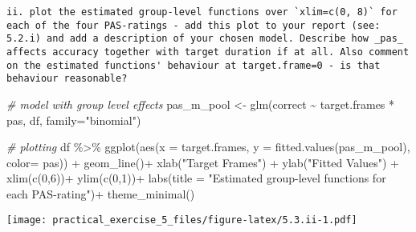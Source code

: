 \documentclass[
]{article}
\newenvironment{Shaded}{\begin{snugshade}}{\end{snugshade}}
\newcommand{\AttributeTok}[1]{\textcolor[rgb]{0.77,0.63,0.00}{#1}}
\newcommand{\CommentTok}[1]{\textcolor[rgb]{0.56,0.35,0.01}{\textit{#1}}}
\newcommand{\DecValTok}[1]{\textcolor[rgb]{0.00,0.00,0.81}{#1}}
\newcommand{\FunctionTok}[1]{\textcolor[rgb]{0.00,0.00,0.00}{#1}}
\newcommand{\NormalTok}[1]{#1}
\newcommand{\OtherTok}[1]{\textcolor[rgb]{0.56,0.35,0.01}{#1}}
\newcommand{\SpecialCharTok}[1]{\textcolor[rgb]{0.00,0.00,0.00}{#1}}
\newcommand{\StringTok}[1]{\textcolor[rgb]{0.31,0.60,0.02}{#1}}
\begin{document}
\begin{verbatim}
ii. plot the estimated group-level functions over `xlim=c(0, 8)` for each of the four PAS-ratings - add this plot to your report (see: 5.2.i) and add a description of your chosen model. Describe how _pas_ affects accuracy together with target duration if at all. Also comment on the estimated functions' behaviour at target.frame=0 - is that behaviour reasonable?  
\end{verbatim}

\begin{Shaded}
\begin{Highlighting}[]
\CommentTok{\# model with group level effects}
\NormalTok{pas\_m\_pool }\OtherTok{\textless{}{-}} \FunctionTok{glm}\NormalTok{(correct }\SpecialCharTok{\textasciitilde{}}\NormalTok{ target.frames }\SpecialCharTok{*}\NormalTok{ pas, df, }\AttributeTok{family=}\StringTok{"binomial"}\NormalTok{)}

\CommentTok{\# plotting}
\NormalTok{df }\SpecialCharTok{\%\textgreater{}\%} \FunctionTok{ggplot}\NormalTok{(}\FunctionTok{aes}\NormalTok{(}\AttributeTok{x =}\NormalTok{ target.frames, }\AttributeTok{y =} \FunctionTok{fitted.values}\NormalTok{(pas\_m\_pool), }\AttributeTok{color=}\NormalTok{ pas)) }\SpecialCharTok{+}
  \FunctionTok{geom\_line}\NormalTok{()}\SpecialCharTok{+}
  \FunctionTok{xlab}\NormalTok{(}\StringTok{"Target Frames"}\NormalTok{) }\SpecialCharTok{+} 
  \FunctionTok{ylab}\NormalTok{(}\StringTok{"Fitted Values"}\NormalTok{) }\SpecialCharTok{+}
  \FunctionTok{xlim}\NormalTok{(}\FunctionTok{c}\NormalTok{(}\DecValTok{0}\NormalTok{,}\DecValTok{6}\NormalTok{))}\SpecialCharTok{+}
  \FunctionTok{ylim}\NormalTok{(}\FunctionTok{c}\NormalTok{(}\DecValTok{0}\NormalTok{,}\DecValTok{1}\NormalTok{))}\SpecialCharTok{+}
  \FunctionTok{labs}\NormalTok{(}\AttributeTok{title =} \StringTok{"Estimated group{-}level functions for each PAS{-}rating"}\NormalTok{)}\SpecialCharTok{+}
  \FunctionTok{theme\_minimal}\NormalTok{()}
\end{Highlighting}
\end{Shaded}

\texttt{[image: practical\_exercise\_5\_files/figure-latex/5.3.ii-1.pdf]}

\begin{Shaded}
\end{Shaded}
\end{document}
